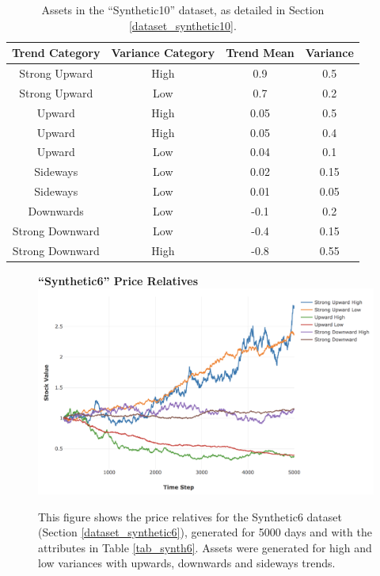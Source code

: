 \documentclass[a4paper,11pt,oneside]{article}
\theoremstyle{plain}
\theoremstyle{definition}
\begin{document}
	\begin{table}[H]
		\centering
		\small
		\begin{tabular}{|c|c|c|c|}
			\hline
			\rowcolor{beaublue}
			\textbf{Trend Category} &\textbf{Variance Category} & \textbf{Trend Mean} & \textbf{Variance}\\\hline	
			{Strong Upward} 		& {High} & {0.9} & {0.5} \\\hline
			{Strong Upward} 		& {Low} & {0.7} & {0.2} \\\hline
			{Upward} 					& {High} & {0.05} & {0.5} \\\hline
			{Upward} 					& {High} & {0.05} & {0.4} \\\hline
			{Upward} 					& {Low} & {0.04} & {0.1} \\\hline
			{Sideways} 					& {Low} & {0.02} & {0.15} \\\hline
			{Sideways}					& {Low} & {0.01} & {0.05} \\\hline
			{Downwards}				& {Low} & {-0.1} & {0.2} \\\hline
			{Strong Downward} 	& {Low} & {-0.4} & {0.15} \\\hline
			{Strong Downward}	& {High} & {-0.8} & {0.55} \\\hline
		\end{tabular}
		\newline\newline
		\caption{Assets in the ``Synthetic10'' dataset, as detailed in Section \ref{dataset_synthetic10}.}\label{tab_synth10}
	\end{table}
	
	\begin{figure}[H]
		\centering
		\textbf{``Synthetic6'' Price Relatives}
		\includegraphics[scale=0.45]{images/results/prices/synthetic6_prices.png} 
		\caption[Synthetic6 Price Relatives]{This figure shows the price relatives for the Synthetic6 dataset (Section \ref{dataset_synthetic6}), generated for 5000 days and with the attributes in Table \ref{tab_synth6}. Assets were generated for high and low variances with upwards, downwards and sideways trends.}
		\label{figure-synthetic6_prices}
	\end{figure}
	
\end{document}

